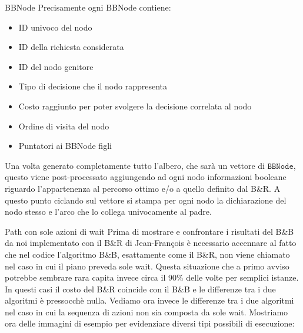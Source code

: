 \documentclass[10pt]{beamer}
\begin{document}
    \begin{frame}{BBNode}
        Precisamente ogni BBNode contiene: 
        \begin{itemize}
            \item ID univoco del nodo
            \item ID della richiesta considerata
            \item ID del nodo genitore
            \item Tipo di decisione che il nodo rappresenta
            \item Costo raggiunto per poter svolgere la decisione correlata al nodo
            \item Ordine di visita del nodo
            \item Puntatori ai BBNode figli
    \end{itemize}
    Una volta generato completamente tutto l'albero, che sarà un vettore di $\texttt{BBNode}$, questo viene post-processato aggiungendo ad ogni nodo informazioni booleane riguardo l'appartenenza al percorso ottimo e/o a quello definito dal B\&R. A questo punto ciclando sul vettore si stampa per ogni nodo la dichiarazione del nodo stesso e l'arco che lo collega univocamente al padre.
    \end{frame}

    \begin{frame}{Path con sole azioni di wait}
        Prima di mostrare e confrontare i risultati del B\&B da noi implementato con il B\&R di Jean-François è necessario accennare al fatto che nel codice l'algoritmo B\&B, esattamente come il B\&R, non viene chiamato nel caso in cui il piano preveda sole wait. Questa situazione che a primo avviso potrebbe sembrare rara capita invece circa il $90\%$ delle volte per semplici istanze. In questi casi il costo del B\&R coincide con il B\&B e le differenze tra i due algoritmi è pressocchè nulla. Vediamo ora invece le differenze tra i due algoritmi nel caso in cui la sequenza di azioni non sia composta da sole wait. Mostriamo ora delle immagini di esempio per evidenziare diversi tipi possibili di esecuzione:
    \end{frame}
\end{document}
